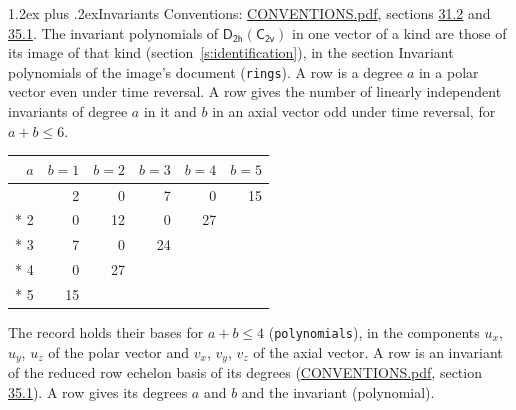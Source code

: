 \documentclass[10pt,a4paper]{article}
\makeatletter
\renewcommand\section{\@startsection{section}{1}{\z@}{-3ex plus -1ex minus -.2ex}%
  {1.2ex plus .2ex}{\normalfont\large\sffamily\bfseries\color{parttitle}}}
\numberwithin{equation}{section}
\newcommand{\grp}[1]{\mathsf{#1}}
\makeatother
\begin{document}
\section{Invariants}\label{s:invariants}
Conventions: \href{../../CONVENTIONS.pdf}{CONVENTIONS.pdf}, sections \href{../../CONVENTIONS.pdf\#conv.31.2}{31.2} and \href{../../CONVENTIONS.pdf\#conv.35.1}{35.1}.
The invariant polynomials of $\grp{D_{2h}}(\grp{C_{2v}})$ in one vector of a kind are those of its image of that kind (section~\ref{s:identification}), in the section Invariant polynomials of the image's document (\texttt{rings}).
\leavevmode\label{n:index.degree.polar}\label{n:index.degree.axial}A row is a degree $a$ in a polar vector even under time reversal. A row gives the number of linearly independent invariants of degree $a$ in it and $b$ in an axial vector odd under time reversal, for $a + b \le 6$.
{\small\begin{longtable}{@{}rrrrrr@{}}\toprule
$a$ & $b = 1$ & $b = 2$ & $b = 3$ & $b = 4$ & $b = 5$\\\midrule\endhead
\bottomrule\endfoot\endlastfoot
1 & 2 & 0 & 7 & 0 & 15\\*
2 & 0 & 12 & 0 & 27 & \\*
3 & 7 & 0 & 24 &  & \\*
4 & 0 & 27 &  &  & \\*
5 & 15 &  &  &  & \\
\bottomrule\end{longtable}}
\leavevmode\label{n:local.component.polar}\label{n:local.component.axial}The record holds their bases for $a + b \le 4$ (\texttt{polynomials}), in the components $u_{x}$, $u_{y}$, $u_{z}$ of the polar vector and $v_{x}$, $v_{y}$, $v_{z}$ of the axial vector. \label{n:head.polynomial}A row is an invariant of the reduced row echelon basis of its degrees (\href{../../CONVENTIONS.pdf}{CONVENTIONS.pdf}, section \href{../../CONVENTIONS.pdf\#conv.35.1}{35.1}). A row gives its degrees $a$ and $b$ and the invariant (polynomial).
\end{document}

